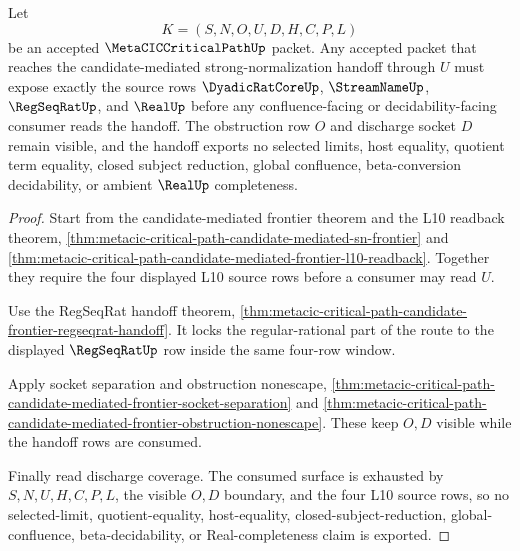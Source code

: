 \begin{theorem}
\label{thm:metacic-critical-path-candidate-mediated-sn-l10-completion-lock}
Let
$$
K=(S,N,O,U,D,H,C,P,L)
$$
be an accepted $\MetaCICCriticalPathUp$ packet. Any accepted packet that reaches the candidate-mediated strong-normalization handoff through $U$ must expose exactly the source rows $\DyadicRatCoreUp$, $\StreamNameUp$, $\RegSeqRatUp$, and $\RealUp$ before any confluence-facing or decidability-facing consumer reads the handoff. The obstruction row $O$ and discharge socket $D$ remain visible, and the handoff exports no selected limits, host equality, quotient term equality, closed subject reduction, global confluence, beta-conversion decidability, or ambient $\RealUp$ completeness.
\end{theorem}
\begin{proof}
Start from the candidate-mediated frontier theorem and the L10 readback theorem, \autoref{thm:metacic-critical-path-candidate-mediated-sn-frontier} and \autoref{thm:metacic-critical-path-candidate-mediated-frontier-l10-readback}. Together they require the four displayed L10 source rows before a consumer may read $U$.

Use the RegSeqRat handoff theorem, \autoref{thm:metacic-critical-path-candidate-frontier-regseqrat-handoff}. It locks the regular-rational part of the route to the displayed $\RegSeqRatUp$ row inside the same four-row window.

Apply socket separation and obstruction nonescape, \autoref{thm:metacic-critical-path-candidate-mediated-frontier-socket-separation} and \autoref{thm:metacic-critical-path-candidate-mediated-frontier-obstruction-nonescape}. These keep $O,D$ visible while the handoff rows are consumed.

Finally read discharge coverage. The consumed surface is exhausted by $S,N,U,H,C,P,L$, the visible $O,D$ boundary, and the four L10 source rows, so no selected-limit, quotient-equality, host-equality, closed-subject-reduction, global-confluence, beta-decidability, or Real-completeness claim is exported.
\end{proof}

